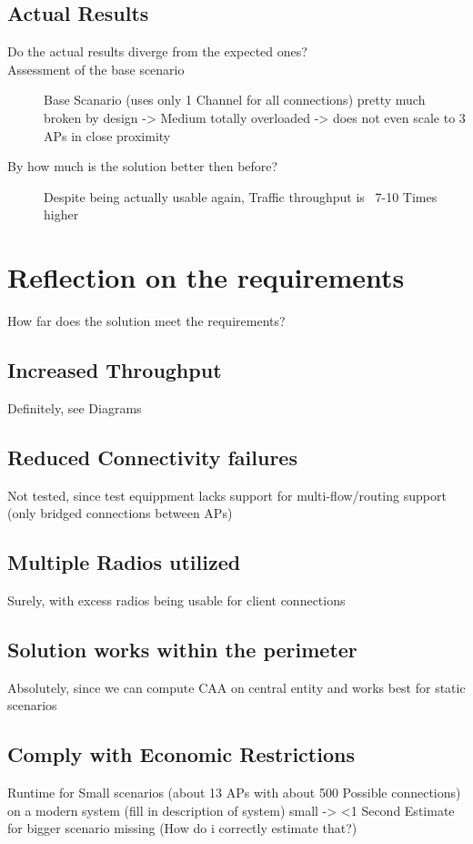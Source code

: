   \subsection{Actual Results}
    \begin{description}
     \item [Do the actual results diverge from the expected ones?]
     \item[Assessment of the base scenario]
      Base Scanario (uses only 1 Channel for all connections) pretty much broken by design -> Medium totally overloaded -> does not even scale to 3 APs in close proximity \newline
     \item[By how much is the solution better then before?]
      Despite being actually usable again, Traffic throughput is ~7-10 Times higher
    \end{description}
\section{Reflection on the requirements}
  How far does the solution meet the requirements?\newline
  \subsection{Increased Throughput}
    Definitely, see Diagrams \newline
  \subsection{Reduced Connectivity failures}
    Not tested, since test equippment lacks support for multi-flow/routing support (only bridged connections between APs) \newline
  \subsection{Multiple Radios utilized}
    Surely, with excess radios being usable for client connections \newline
  \subsection{Solution works within the perimeter}
    Absolutely, since we can compute CAA on central entity and works best for static scenarios \newline
  \subsection{Comply with Economic Restrictions}
    Runtime for Small scenarios (about 13 APs with about 500 Possible connections) on a modern system (fill in description of system) small -> <1 Second
    Estimate for bigger scenario missing (How do i correctly estimate that?)

